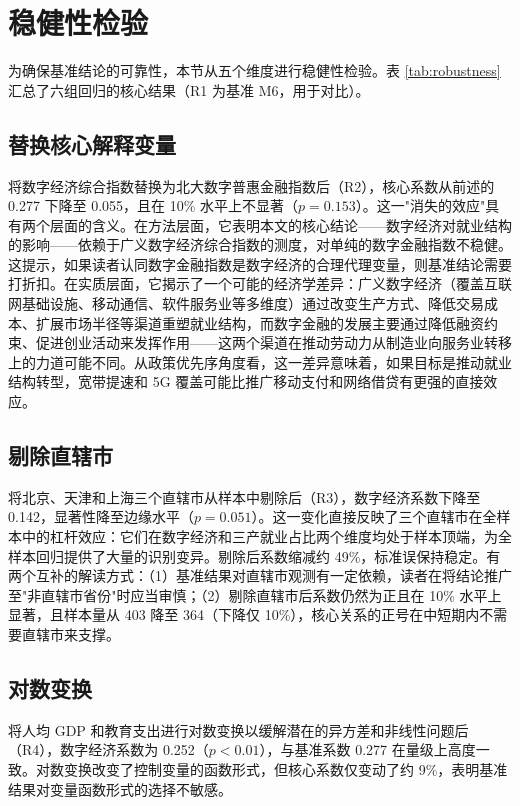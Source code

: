 \section{稳健性检验}

为确保基准结论的可靠性，本节从五个维度进行稳健性检验。表 \ref{tab:robustness} 汇总了六组回归的核心结果（R1 为基准 M6，用于对比）。



\subsection{替换核心解释变量}

将数字经济综合指数替换为北大数字普惠金融指数后（R2），核心系数从前述的 0.277 下降至 0.055，且在 10\% 水平上不显著（$p=0.153$）。这一"消失的效应"具有两个层面的含义。在方法层面，它表明本文的核心结论——数字经济对就业结构的影响——依赖于广义数字经济综合指数的测度，对单纯的数字金融指数不稳健。这提示，如果读者认同数字金融指数是数字经济的合理代理变量，则基准结论需要打折扣。在实质层面，它揭示了一个可能的经济学差异：广义数字经济（覆盖互联网基础设施、移动通信、软件服务业等多维度）通过改变生产方式、降低交易成本、扩展市场半径等渠道重塑就业结构，而数字金融的发展主要通过降低融资约束、促进创业活动来发挥作用——这两个渠道在推动劳动力从制造业向服务业转移上的力道可能不同。从政策优先序角度看，这一差异意味着，如果目标是推动就业结构转型，宽带提速和 5G 覆盖可能比推广移动支付和网络借贷有更强的直接效应。

\subsection{剔除直辖市}

将北京、天津和上海三个直辖市从样本中剔除后（R3），数字经济系数下降至 0.142，显著性降至边缘水平（$p=0.051$）。这一变化直接反映了三个直辖市在全样本中的杠杆效应：它们在数字经济和三产就业占比两个维度均处于样本顶端，为全样本回归提供了大量的识别变异。剔除后系数缩减约 49\%，标准误保持稳定。有两个互补的解读方式：（1）基准结果对直辖市观测有一定依赖，读者在将结论推广至"非直辖市省份"时应当审慎；（2）剔除直辖市后系数仍然为正且在 10\% 水平上显著，且样本量从 403 降至 364（下降仅 10\%），核心关系的正号在中短期内不需要直辖市来支撑。

\subsection{对数变换}

将人均 GDP 和教育支出进行对数变换以缓解潜在的异方差和非线性问题后（R4），数字经济系数为 0.252（$p<0.01$），与基准系数 0.277 在量级上高度一致。对数变换改变了控制变量的函数形式，但核心系数仅变动了约 9\%，表明基准结果对变量函数形式的选择不敏感。


